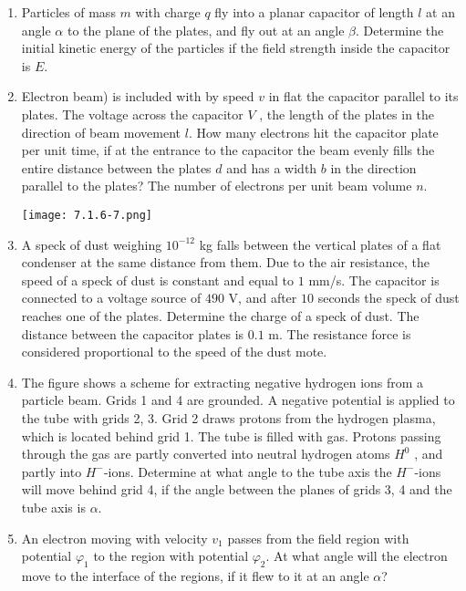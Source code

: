 \documentclass{article}
\begin{document}
\begin{enumerate}[label=7.1.\arabic*]
\item Particles of mass $m$ with charge $q$ fly into a planar capacitor of length $l$ at an angle $\alpha$ to the plane of the plates, and fly out at an angle $\beta$. Determine the initial kinetic energy of the particles if the field strength inside the capacitor is $E$.

\item Electron beam) is included with by speed $v$ in flat the capacitor parallel to its plates. The voltage across the capacitor $V$ , the length of the plates in the direction of beam movement $l$. How many electrons hit the capacitor plate per unit time, if at the entrance to the capacitor the beam evenly fills the entire distance between the plates $d$ and has a width $b$ in the direction parallel to the plates? The number of electrons per unit beam volume $n$.

\begin{center}
    \texttt{[image: 7.1.6-7.png]}
\end{center}

\item A speck of dust weighing $10^{-12}$ kg falls between the vertical plates of a flat condenser at the same distance from them. Due to the air resistance, the speed of a speck of dust is constant and equal to $1$ mm/s. The capacitor is connected to a voltage source of $490$ V, and after $10$ seconds the speck of dust reaches one of the plates. Determine the charge of a speck of dust. The distance between the capacitor plates is $0.1$ m. The resistance force is considered proportional to the speed of the dust mote.

\item The figure shows a scheme for extracting negative hydrogen ions from a particle beam. Grids 1 and 4 are grounded. A negative potential is applied to the tube with grids 2, 3. Grid 2 draws protons from the hydrogen plasma, which is located behind grid 1. The tube is filled with gas. Protons passing through the gas are partly converted into neutral hydrogen atoms $H^0$ , and partly into $H^-$-ions. Determine at what angle to the tube axis the $H^-$-ions will move behind grid 4, if the angle between the planes of grids 3, 4 and the tube axis is $\alpha$.

\item An electron moving with velocity $v_1$ passes from the field region with potential $\varphi_1$ to the region with potential $\varphi_2$. At what angle will the electron move to the interface of the regions, if it flew to it at an angle $\alpha$?


\end{enumerate}
\end{document}
